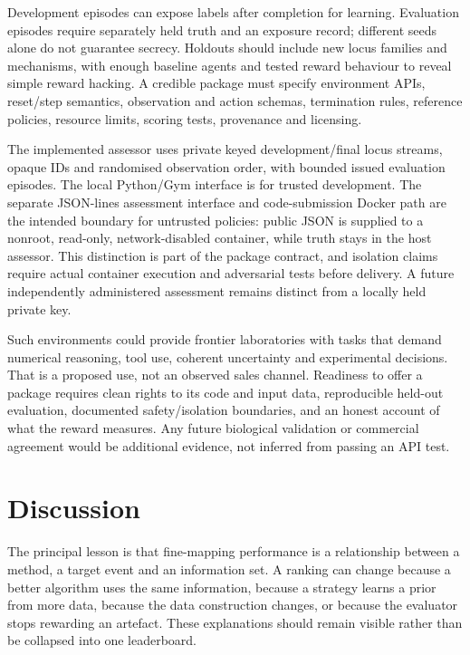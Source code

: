 \documentclass[
  british,
  10pt,
]{article}
\begin{document}
Development episodes can expose labels after completion for learning.
Evaluation episodes require separately held truth and an exposure
record; different seeds alone do not guarantee secrecy. Holdouts should
include new locus families and mechanisms, with enough baseline agents
and tested reward behaviour to reveal simple reward hacking. A credible
package must specify environment APIs, reset/step semantics, observation
and action schemas, termination rules, reference policies, resource
limits, scoring tests, provenance and licensing.

The implemented assessor uses private keyed development/final locus
streams, opaque IDs and randomised observation order, with bounded
issued evaluation episodes. The local Python/Gym interface is for
trusted development. The separate JSON-lines assessment interface and
code-submission Docker path are the intended boundary for untrusted
policies: public JSON is supplied to a nonroot, read-only,
network-disabled container, while truth stays in the host assessor. This
distinction is part of the package contract, and isolation claims
require actual container execution and adversarial tests before
delivery. A future independently administered assessment remains
distinct from a locally held private key.

Such environments could provide frontier laboratories with tasks that
demand numerical reasoning, tool use, coherent uncertainty and
experimental decisions. That is a proposed use, not an observed sales
channel. Readiness to offer a package requires clean rights to its code
and input data, reproducible held-out evaluation, documented
safety/isolation boundaries, and an honest account of what the reward
measures. Any future biological validation or commercial agreement would
be additional evidence, not inferred from passing an API test.

\section{Discussion}\label{discussion}

The principal lesson is that fine-mapping performance is a relationship
between a method, a target event and an information set. A ranking can
change because a better algorithm uses the same information, because a
strategy learns a prior from more data, because the data construction
changes, or because the evaluator stops rewarding an artefact. These
explanations should remain visible rather than be collapsed into one
leaderboard.
\end{document}
